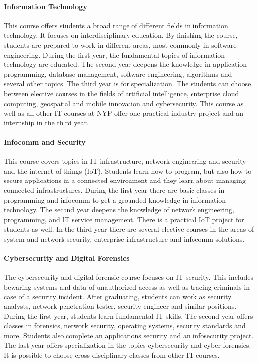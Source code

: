 \paragraph{Information Technology}
This course offers students a broad range of different fields in information technology. It focuses on interdisciplinary education. By finishing the course, students are prepared to work in different areas, most commonly in software engineering. During the first year, the fundamental topics of information technology are educated. The second year deepens the knowledge in application programming, database management, software engineering, algorithms and several other topics. The third year is for specialization. The students can choose between elective courses in the fields of artificial intelligence, enterprise cloud computing, geospatial and mobile innovation and cybersecurity. This course as well as all other IT courses at NYP offer one practical industry project and an internship in the third year.

\paragraph{Infocomm and Security}
This course covers topics in IT infrastructure, network engineering and security and the internet of things (IoT). Students learn how to program, but also how to secure applications in a connected environment and they learn about managing connected infrastructures. During the first year there are basic classes in programming and infocomm to get a grounded knowledge in information technology. The second year deepens the knowledge of network engineering, programming, and IT service management. There is a practical IoT project for students as well.
In the third year there are several elective courses in the areas of system and network security, enterprise infrastructure and infocomm solutions.

\paragraph{Cybersecurity and Digital Forensics}
The cybersecurity and digital forensic course focuses on IT security. This includes bewaring systems and data of unauthorized access as well as tracing criminals in case of a security incident. After graduating, students can work as security analysts, network penetration tester, security engineer and similar positions. During the first year, students learn fundamental IT skills. The second year offers classes in forensics, network security, operating systems, security standards and more. Students also complete an applications security and an infosecurity project.
The last year offers specialization in the topics cybersecurity  and cyber forensics. It is possible to choose cross-disciplinary classes from other IT courses.

